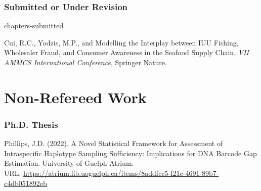 \subsubsection{Submitted or Under Revision}
\begin{revlist}{chapters-submitted}
\item \dsup Cui, R.C., Yodzis, M.P., and \me Modelling the Interplay between IUU
  Fishing, Wholesaler Fraud, and Consumer Awareness in the Seafood Supply Chain.
  \textit{VII AMMCS International Conference}, Springer Nature.
\end{revlist}


\section{Non-Refereed Work}
\subsubsection{Ph.D. Thesis}
Phillips, J.D. (2022). A Novel Statistical Framework for Assessment of Intraspecific
Haplotype Sampling Sufficiency: Implications for DNA Barcode Gap
Estimation. University of Guelph Atrium.\\
URL: \url{https://atrium.lib.uoguelph.ca/items/8addfcc5-f21c-4691-89b7-c4db051892eb}

\bigskip
\legenddirect

